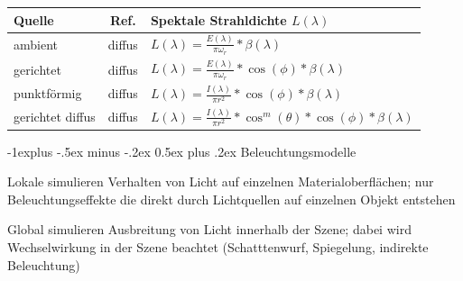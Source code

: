 \documentclass[landscape]{article}
\makeatletter
\renewcommand{\subsection}{\@startsection{subsection}{2}{0mm}%
                                {-1explus -.5ex minus -.2ex}%
                                {0.5ex plus .2ex}%
                                {\normalfont\normalsize\bfseries}}
\makeatother
\begin{document}
\begin{multicols}{3}
  \begin{tabular}{l | c | l}
    Quelle           & Ref.   & Spektale Strahldichte $L(\lambda)$                                                 \\\hline
    ambient          & diffus & $L(\lambda)=\frac{E(\lambda)}{\pi\omega_r}*\beta(\lambda)$                         \\
    gerichtet        & diffus & $L(\lambda)=\frac{E(\lambda)}{\pi\omega_r}*\cos(\phi)*\beta(\lambda)$              \\
    punktförmig      & diffus & $L(\lambda) = \frac{I(\lambda)}{\pi r^2 }*\cos(\phi)*\beta(\lambda)$               \\
    gerichtet diffus & diffus & $L(\lambda)=\frac{I(\lambda)}{\pi r^2 }* \cos^m(\theta)*\cos(\phi)*\beta(\lambda)$ \\
  \end{tabular}
  
  \subsection{Beleuchtungsmodelle}
  \begin{description*}
    \item[Lokale] simulieren Verhalten von Licht auf einzelnen Materialoberflächen; nur Beleuchtungseffekte die direkt durch Lichtquellen auf einzelnen Objekt entstehen
    \item[Global] simulieren Ausbreitung von Licht innerhalb der Szene; dabei wird Wechselwirkung in der Szene beachtet (Schatttenwurf, Spiegelung, indirekte Beleuchtung)
  \end{description*}
  

\end{multicols}
\end{document}
